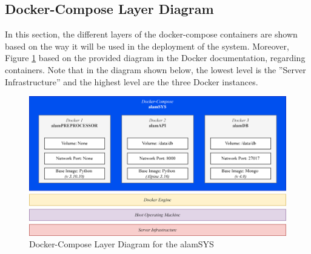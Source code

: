 \subsection{Docker-Compose Layer Diagram}
\label{subsec:docker_compose_diagram}
In this section, the different layers of the docker-compose 
containers are shown based on the way it will be used in the 
deployment of the system. Moreover, Figure \ref{fig:docker_compose_layout} 
based on the provided diagram in the Docker documentation, regarding containers. 
Note that in the diagram shown below, the lowest level is the 
”Server Infrastructure” and the highest level are the three Docker instances.
\begin{figure}[ht]
    \centering
    \includegraphics[width=1\textwidth]{./assets/Chapter_3/Docker-Compose Layout.png}
    \caption{Docker-Compose Layer Diagram for the alamSYS}
    \label{fig:docker_compose_layout}
\end{figure}